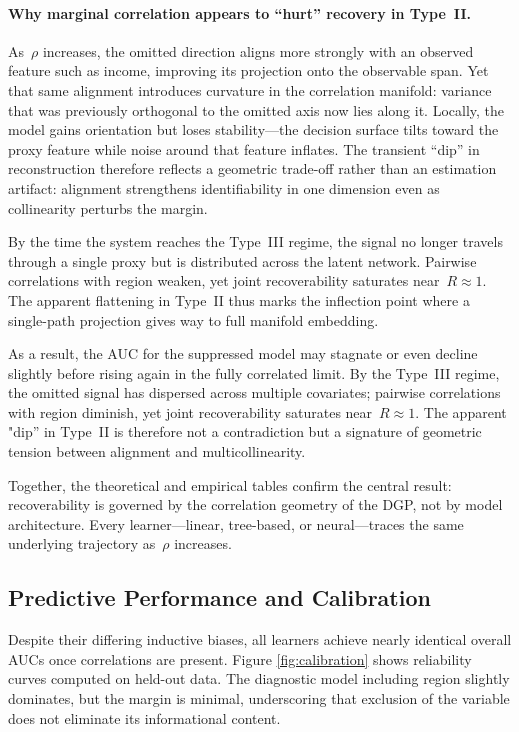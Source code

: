 \documentclass[11pt]{article}
\begin{document}
\paragraph{Why marginal correlation appears to ``hurt'' recovery in Type~II.}
As~$\rho$ increases, the omitted direction aligns more strongly with an observed
feature such as income, improving its projection onto the observable span.
Yet that same alignment introduces curvature in the correlation manifold:
variance that was previously orthogonal to the omitted axis now lies along it.
Locally, the model gains orientation but loses stability—the decision surface
tilts toward the proxy feature while noise around that feature inflates.
The transient ``dip'' in reconstruction therefore reflects a geometric trade-off
rather than an estimation artifact: alignment strengthens identifiability in one
dimension even as collinearity perturbs the margin.  

By the time the system reaches the Type~III regime, the signal no longer travels
through a single proxy but is distributed across the latent network.
Pairwise correlations with region weaken, yet joint recoverability saturates
near~$R\!\approx\!1$.
The apparent flattening in Type~II thus marks the inflection point where a
single-path projection gives way to full manifold embedding.

As a result, the AUC for the suppressed model may stagnate or even decline
slightly before rising again in the fully correlated limit.
By the Type~III regime, the omitted signal has dispersed across multiple
covariates; pairwise correlations with region diminish, yet joint
recoverability saturates near~$R\!\approx\!1$.  
The apparent "dip'' in Type~II is therefore not a contradiction but a
signature of geometric tension between alignment and multicollinearity.

Together, the theoretical and empirical tables confirm the central result:
recoverability is governed by the correlation geometry of the DGP, not by
model architecture.  
Every learner---linear, tree-based, or neural---traces the same underlying
trajectory as~$\rho$ increases.

\subsection{Predictive Performance and Calibration}

Despite their differing inductive biases, all learners achieve nearly identical overall AUCs once correlations are present.  
Figure \ref{fig:calibration} shows reliability curves computed on held-out data.  
The diagnostic model including region slightly dominates, but the margin is minimal, underscoring that exclusion of the variable does not eliminate its informational content.
\end{document}
